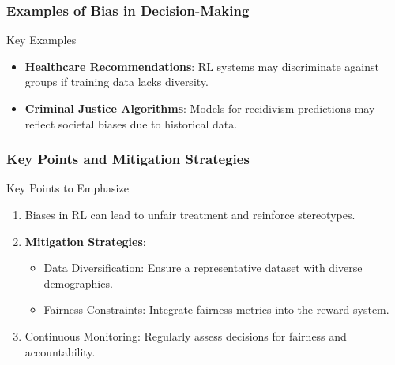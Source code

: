 \documentclass{beamer}
\begin{document}
\begin{frame}[fragile]
    \frametitle{Examples of Bias in Decision-Making}
    \begin{block}{Key Examples}
        \begin{itemize}
            \item \textbf{Healthcare Recommendations}: RL systems may discriminate against groups if training data lacks diversity.
            \item \textbf{Criminal Justice Algorithms}: Models for recidivism predictions may reflect societal biases due to historical data.
        \end{itemize}
    \end{block}
\end{frame}

\begin{frame}[fragile]
    \frametitle{Key Points and Mitigation Strategies}
    \begin{block}{Key Points to Emphasize}
        \begin{enumerate}
            \item Biases in RL can lead to unfair treatment and reinforce stereotypes.
            \item \textbf{Mitigation Strategies}:
                \begin{itemize}
                    \item Data Diversification: Ensure a representative dataset with diverse demographics.
                    \item Fairness Constraints: Integrate fairness metrics into the reward system.
                \end{itemize}
            \item Continuous Monitoring: Regularly assess decisions for fairness and accountability.
        \end{enumerate}
    \end{block}
\end{frame}
\end{document}
